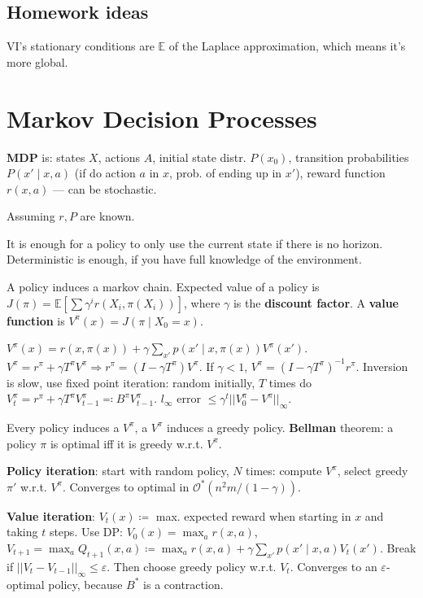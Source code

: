 \documentclass[11pt,landscape,a4paper,fleqn]{article}
\begin{document}
\begin{multicols*}{4}
\subsection{Homework ideas}

VI's stationary conditions are \(\mathbb{E}\) of the Laplace approximation, which means it's more global.

\section{Markov Decision Processes}

\textbf{MDP} is: states \(X\), actions \(A\), initial state distr. \(P(x_0)\),
transition probabilities \(P(x' \mid x, a)\) (if do action \(a\) in \(x\), prob. of ending up in \(x'\)),
reward function \(r(x, a)\) --- can be stochastic.

Assuming \(r, P\) are known.

It is enough for a policy to only use the current state if there is no horizon.
Deterministic is enough, if you have full knowledge of the environment.

A policy induces a markov chain.
Expected value of a policy is \(J(\pi) = \mathbb{E}[\sum \gamma^i r(X_i, \pi(X_i))]\),
where \(\gamma\) is the \textbf{discount factor}.
A \textbf{value function} is \(V^\pi(x) = J(\pi \mid X_0 = x)\). 

\(V^\pi(x) = r(x, \pi(x)) + \gamma \sum_{x'} p(x' \mid x, \pi(x)) V^\pi(x')\).
\(V^\pi = r^\pi + \gamma T^\pi V^\pi \Rightarrow r^\pi = (I - \gamma T^\pi) V^\pi\).
If \(\gamma < 1\), \(V^\pi = (I - \gamma T^\pi)^{-1} r^\pi\).
Inversion is slow, use fixed point iteration: random initially,
\(T\) times do \(V^\pi_t = r^\pi + \gamma T^\pi V^\pi_{t-1} \eqqcolon B^\pi V^\pi_{t-1}\).
\(l_{\infty}\) error \(\leq \gamma^t ||V^\pi_0 - V^\pi||_{\infty}\).

Every policy induces a \(V^\pi\), a \(V^\pi\) induces a greedy policy.
\textbf{Bellman} theorem: a policy \(\pi\) is optimal iff it is greedy w.r.t. \(V^\pi\).

\textbf{Policy iteration}: start with random policy, \(N\) times: compute \(V^\pi\), select greedy \(\pi'\) w.r.t. \(V^\pi\).
Converges to optimal in \(\mathcal{O}^*(n^2 m / (1 - \gamma))\).

\textbf{Value iteration}:
\(V_t(x) \coloneqq \) max. expected reward when starting in \(x\) and taking \(t\) steps.
Use DP:
\(V_0(x) = \max_a r(x, a)\), \(V_{t+1} = \max_a Q_{t+1}(x, a) \coloneqq \max_a r(x, a) + \gamma \sum_{x'} p(x' \mid x, a) V_t(x')\).
Break if \(||V_t - V_{t-1}||_\infty \leq \varepsilon\).
Then choose greedy policy w.r.t. \(V_t\).
Converges to an \(\varepsilon\)-optimal policy, because \(B^*\) is a contraction.


\end{multicols*}
\end{document}
